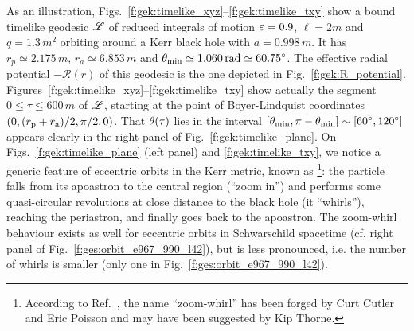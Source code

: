 As an illustration, Figs.~\ref{f:gek:timelike_xyz}--\ref{f:gek:timelike_txy}
show a bound timelike geodesic $\mathscr{L}$ of reduced integrals of motion
$\varepsilon=0.9$, $\ell=2 m$ and $q=1.3\, m^2$
orbiting around a Kerr black hole with $a=0.998\, m$.
It has $r_p \simeq 2.175\, m$,
$r_a \simeq 6.853\, m$ and $\theta_{\rm min} \simeq 1.060\, {\rm rad} \simeq 60.75^\circ$.
The effective radial potential
$-\mathcal{R}(r)$ of this geodesic is the one depicted in Fig.~\ref{f:gek:R_potential}.
Figures~\ref{f:gek:timelike_xyz}--\ref{f:gek:timelike_txy} show actually the
segment $0\leq \tau \leq 600 \, m$ of $\mathscr{L}$,
starting at the point of Boyer-Lindquist coordinates
$(0, (r_{\rm p} + r_{\rm a})/2, \pi/2, 0)$.
That $\theta(\tau)$ lies in the interval
$[\theta_{\rm min}, \pi-\theta_{\rm min}] \sim [60^\circ, 120^\circ]$ appears clearly in the
right panel of Fig.~\ref{f:gek:timelike_plane}. On Figs.~\ref{f:gek:timelike_plane}
(left panel) and \ref{f:gek:timelike_txy}, we notice a generic feature
of eccentric orbits in the Kerr metric, known as
\footnote{According to Ref.~\cite{GlampK02},
the name ``zoom-whirl'' has been forged by Curt Cutler and Eric Poisson and
may have been suggested by Kip Thorne.}:
the particle falls
from its apoastron to the central region (``zoom in'') and performs some
quasi-circular revolutions at close distance to the black hole (it ``whirls''), reaching
the periastron, and finally goes back to the apoastron. The zoom-whirl behaviour
exists as well for eccentric orbits in Schwarschild spacetime (cf. right panel
of Fig.~\ref{f:ges:orbit_e967_990_l42}), but is less
pronounced, i.e. the number of whirls is smaller (only one in
Fig.~\ref{f:ges:orbit_e967_990_l42}).


